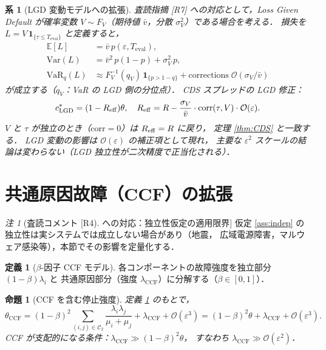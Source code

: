\documentclass[12pt,a4paper]{article}
\theoremstyle{plain}
\newtheorem{proposition}[theorem]{命題}
\newtheorem{corollary}[theorem]{系}
\theoremstyle{definition}
\newtheorem{definition}[theorem]{定義}
\theoremstyle{remark}
\newtheorem{remark}[theorem]{注}
\newcommand{\bE}{\mathbb{E}}
\newcommand{\calO}{\mathcal{O}}
\newcommand{\eps}{\varepsilon}
\newcommand{\VaR}{\mathrm{VaR}}
\newcommand{\calCtwo}{\mathcal{C}_2}
\newcommand{\Teval}{T_{\mathrm{eval}}}
\begin{document}
\begin{corollary}[LGD 変動モデルへの拡張]\label{cor:LGD}
  査読指摘 [R7] への対応として，Loss Given Default が確率変数
  $V\sim F_V$（期待値 $\bar{v}$，分散 $\sigma_V^2$）である場合を考える．
  損失を $L = V\,\mathbf{1}_{\{\tau\le\Teval\}}$ と定義すると，
  \begin{align}
    \bE[L] &= \bar{v}\,p(\eps,\Teval),
    \label{eq:EL_LGD}\\
    \mathrm{Var}(L) &= \bar{v}^2\,p(1-p) + \sigma_V^2\,p,
    \label{eq:VarL_LGD}\\
    \VaR_q(L) &\approx F_V^{-1}(q_V)\,\mathbf{1}_{\{p>1-q\}}
              + \mathrm{corrections}\;\calO(\sigma_V/\bar{v})
    \label{eq:VaR_LGD}
  \end{align}
  が成立する（$q_V$：VaR の LGD 側の分位点）．
  CDS スプレッドの LGD 修正：
  \begin{equation}
    c^*_{\mathrm{LGD}}
    = (1-R_{\rm eff})\theta,\quad
    R_{\rm eff} = R - \frac{\sigma_V}{\bar{v}}\cdot\mathrm{corr}(\tau, V)\cdot\calO(\eps).
  \end{equation}
  $V$ と $\tau$ が独立のとき（$\mathrm{corr}=0$）は $R_{\rm eff}=R$ に戻り，
  定理 \ref{thm:CDS} と一致する．
  LGD 変動の影響は $\calO(\eps)$ の補正項として現れ，
  主要な $\eps^2$ スケールの結論は変わらない（LGD 独立性が二次精度で正当化される）．
\end{corollary}

\section{共通原因故障（CCF）の拡張}\label{sec:CCF}

\begin{remark}[査読コメント [R4] への対応：独立性仮定の適用限界]
  仮定 \ref{ass:indep} の独立性は実システムでは成立しない場合があり（地震，
  広域電源障害，マルウェア感染等），本節でその影響を定量化する．
\end{remark}

\begin{definition}[$\beta$-因子 CCF モデル]\label{def:ccf}
  各コンポーネントの故障強度を独立部分 $(1-\beta)\lambda_i$ と
  共通原因部分（強度 $\lambda_{\mathrm{CCF}}$）に分解する（$\beta\in[0,1]$）．
\end{definition}

\begin{proposition}[CCF を含む停止強度]\label{prop:ccf}
  定義 \ref{def:ccf} のもとで，
  \begin{equation}\label{eq:theta_CCF}
    \theta_{\mathrm{CCF}}
    = (1-\beta)^2\sum_{(i,j)\in\calCtwo}\frac{\lambda_i\lambda_j}{\mu_i+\mu_j}
    + \lambda_{\mathrm{CCF}}
    + \calO(\eps^3)
    = (1-\beta)^2\theta + \lambda_{\mathrm{CCF}} + \calO(\eps^3).
  \end{equation}
  CCF が支配的になる条件：$\lambda_{\mathrm{CCF}} \gg (1-\beta)^2\theta$，
  すなわち $\lambda_{\mathrm{CCF}} \gg \calO(\eps^2)$．
\end{proposition}
\end{document}
